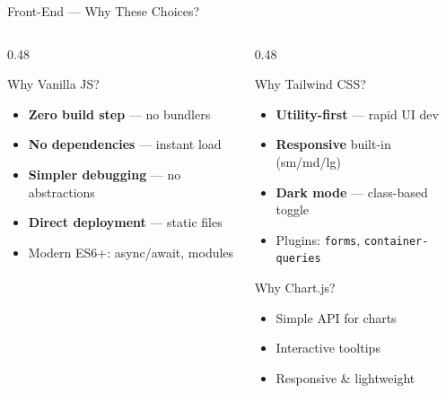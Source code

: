 \documentclass[aspectratio=169, 12pt]{beamer}
\begin{document}
\begin{frame}[shrink=4]{Front-End --- Why These Choices?}\small

\begin{columns}[T]
\begin{column}{0.48\textwidth}
\begin{block}{Why Vanilla JS?}
\begin{itemize}\itemsep=0pt
    \item \textbf{Zero build step} --- no bundlers
    \item \textbf{No dependencies} --- instant load
    \item \textbf{Simpler debugging} --- no abstractions
    \item \textbf{Direct deployment} --- static files
    \item Modern ES6+: async/await, modules
\end{itemize}
\end{block}
\end{column}
\begin{column}{0.48\textwidth}
\begin{block}{Why Tailwind CSS?}
\begin{itemize}\itemsep=0pt
    \item \textbf{Utility-first} --- rapid UI dev
    \item \textbf{Responsive} built-in (sm/md/lg)
    \item \textbf{Dark mode} --- class-based toggle
    \item Plugins: \texttt{forms}, \texttt{container-queries}
\end{itemize}
\end{block}
\vspace{2pt}
\begin{block}{Why Chart.js?}
\begin{itemize}\itemsep=0pt
    \item Simple API for charts
    \item Interactive tooltips
    \item Responsive \& lightweight
\end{itemize}
\end{block}
\end{column}
\end{columns}
\end{frame}
\end{document}
